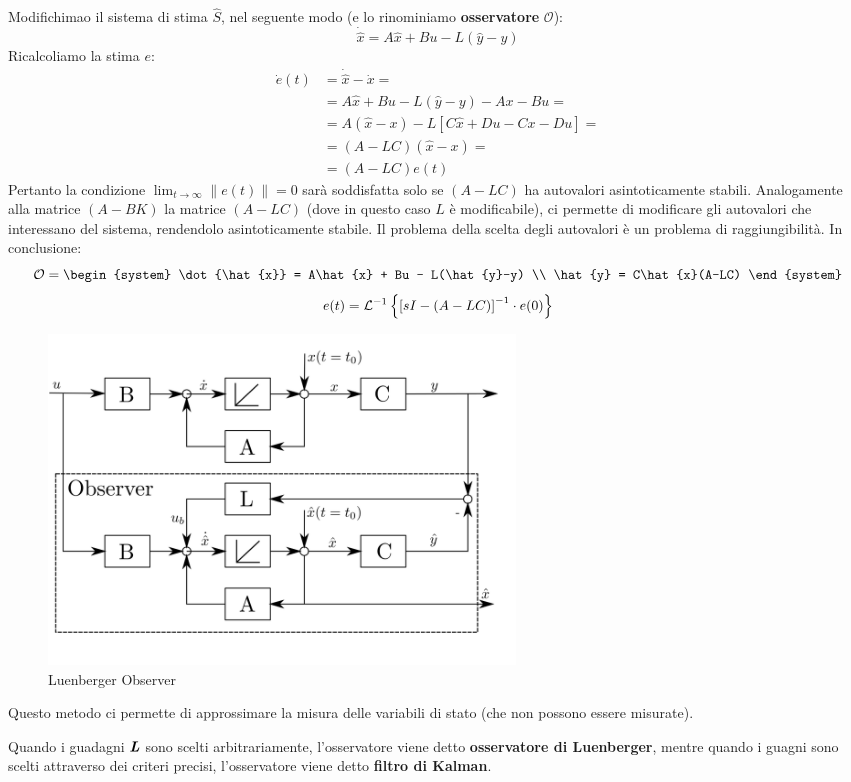 \documentclass[12pt]{article}
\begin{document}
Modifichimao il sistema di stima $\hat{S}$, nel seguente modo (e lo rinominiamo \textbf{osservatore} $\mathcal{O}$):
\[ \dot{\hat{x}} = A\hat{x} + Bu -L(\hat{y} - y) \]
Ricalcoliamo la stima $e$:
\begin{align*}
\dot{e}(t) & = \dot{\hat{x}} - \dot{x} = \\
           & = A\hat{x} + Bu -L(\hat{y} - y) -Ax -Bu = \\
           & = A(\hat{x}-x) -L\left[ C\hat{x} + Du - Cx - Du \right] = \\
           & = (A-LC)(\hat{x} - x) = \\
           & = (A-LC)e(t)
\end{align*}
Pertanto la condizione $\lim_{t \to \infty} \|e(t)\| = 0$ sar\`a soddisfatta solo se $(A-LC)$ ha autovalori asintoticamente stabili. Analogamente alla matrice $(A-BK)$ la matrice $(A-LC)$ (dove in questo caso $L$ \`e modificabile), ci permette di modificare gli autovalori che interessano del sistema, rendendolo asintoticamente stabile. Il problema della scelta degli autovalori \`e un problema di raggiungibilit\`a. In conclusione:
\[ \mathcal{O} = \begin{system} 
    \dot{\hat{x}} = A\hat{x} + Bu - L(\hat{y}-y) \\
    \hat{y} = C\hat{x}(A-LC)
\end{system}  \]
\[ e(t) = \mathcal{L}^{-1} \left\{ \left[ sI - (A-LC) \right]^{-1}\cdot e(0)  \right\}  \]
\begin{figure}[H]
    \centering
    \includegraphics[width=0.6\textwidth]{luenberger_observer.png}
    \caption{Luenberger Observer}
    \label{fig:luenberger_observer}
\end{figure}

Questo metodo ci permette di approssimare la misura delle variabili di stato (che non possono essere misurate).

Quando i guadagni $\textbf{\textit{L}}$ sono scelti arbitrariamente, l'osservatore viene detto \textbf{osservatore di Luenberger}, mentre quando i guagni sono scelti attraverso dei criteri precisi, l'osservatore viene detto \textbf{filtro di Kalman}.
\end{document}

